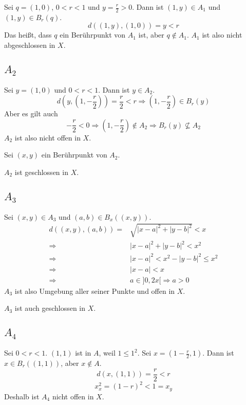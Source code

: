 \documentclass[10pt,a4paper]{article}
\begin{document}
Sei $q = (1, 0)$, $0 < r < 1$ und $y = \frac{r}{2} > 0$.
Dann ist $(1, y) \in A_{1}$ und $(1, y) \in B_{r}(q)$.
\begin{equation}
d((1, y), (1, 0)) = y < r
\end{equation}
Das heißt, dass $q$ ein Berührpunkt von $A_{1}$ ist, aber $q \notin A_{1}$. 
$A_{1}$ ist also nicht abgeschlossen in $X$.

\subsection*{$A_{2}$}

Sei $y = (1, 0)$ und $0 < r < 1$.
Dann ist $y \in A_{2}$.
\begin{equation}
d(y, (1, -\frac{r}{2})) = \frac{r}{2} < r \Rightarrow (1, -\frac{r}{2}) \in B_{r}(y)
\end{equation}
Aber es gilt auch
\begin{equation}
-\frac{r}{2} < 0 \Rightarrow (1, -\frac{r}{2}) \notin A_{2} \Rightarrow B_{r}(y) \nsubseteq A_{2}
\end{equation}
$A_{2}$ ist also nicht offen in $X$.

Sei $(x, y)$ ein Berührpunkt von $A_{2}$.

$A_{2}$ ist geschlossen in $X$.

\subsection*{$A_{3}$}

Sei $(x, y) \in A_{3}$ und $(a, b) \in B_{x}((x, y))$.
\begin{align}
d((x, y), (a, b)) = & \sqrt{|x - a|^{2} + |y - b|^{2}} < x\\
\Rightarrow & |x - a|^{2} + |y - b|^{2} < x^{2}\\
\Rightarrow & |x - a|^{2} < x^{2} - |y - b|^{2} \le x^{2}\\
\Rightarrow & |x - a| < x\\
\Rightarrow & a \in ]0, 2x[ \Rightarrow a > 0
\end{align}
$A_{3}$ ist also Umgebung aller seiner Punkte und offen in $X$.

$A_{3}$ ist auch geschlossen in $X$.

\subsection*{$A_{4}$}

Sei $0 < r < 1$.
$(1, 1)$ ist in $A$, weil $1 \le 1^{2}$.
Sei $x = (1 - \frac{r}{2}, 1)$.
Dann ist $x \in B_{r}((1, 1))$, aber $x \notin A$.
\begin{equation}
d(x, (1, 1)) = \frac{r}{2} < r
\end{equation}
\begin{equation}
x_{x}^{2} = (1 - r)^{2} < 1 = x_{y}
\end{equation}
Deshalb ist $A_{4}$ nicht offen in $X$.
\end{document}

